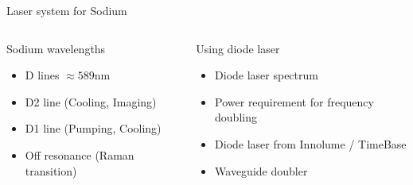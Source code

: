 \documentclass{beamer}
\begin{document}




\begin{frame}{Laser system for Sodium}
  \begin{columns}
    \column{5.8cm}
    \begin{block}{Sodium wavelengths}
      \begin{itemize}
      \item<1-> D lines $\approx589$nm
      \item<2-> D2 line (Cooling, Imaging)
      \item<3-> D1 line (Pumping, Cooling)
      \item<4-> Off resonance (Raman transition)
      \end{itemize}
    \end{block}
    \column{5.8cm}
     {
      \begin{block}{Using diode laser}
        \begin{itemize}
        \item<6-> Diode laser spectrum
        \item<8-> Power requirement for frequency doubling
        \item<9-> Diode laser from Innolume / TimeBase\\
        \item<12-> Waveguide doubler
        \end{itemize}
      \end{block}
    }
  \end{columns}
\end{frame}
\end{document}
